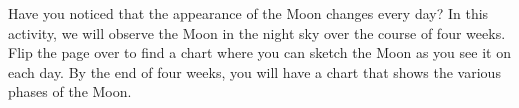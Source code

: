 \documentclass[a4paper,12pt,landscape]{article}
\newcommand{\kn}[1]{{\kannadafont #1}}
\begin{document}
\thispagestyle{empty}
\begin{figure}
    \centering
\end{figure}
\newpage
\centering
\begin{minipage}{0.8\textwidth}
    \vspace{3cm}
    \Large
    Have you noticed that the appearance of the Moon changes every day? In this activity, we will observe the Moon in the night sky over the course of four weeks. Flip the page over to find a chart where you can sketch the Moon as you see it on each day. By the end of four weeks, you will have a chart that shows the various phases of the Moon.
\end{minipage}
\end{document}
